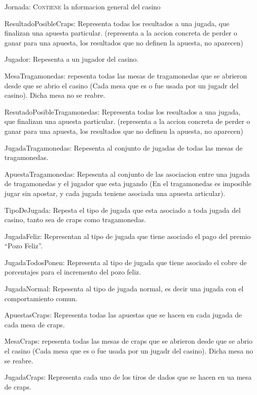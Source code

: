 Jornada: \textsc{Contiene} la nformacion general del casino

ResultadoPosibleCraps: Representa todas los resultados a una jugada, que finalizan una apuesta particular. (representa a la accion concreta de perder o ganar para una apuesta, los resultados que no definen la apuesta, no aparecen)

Jugador: Repesenta a un jugador del casino.

MesaTragamonedas: repesenta todas las mesas de tragamonedas que se abrieron desde que se abrio el casino (Cada mesa que es o fue usada por un jugadr del casino). Dicha mesa no se reabre.

ResutadoPosibleTragamonedas: Representa todas los resultados a una jugada, que finalizan una apuesta particular. (representa a la accion concreta de perder o ganar para una apuesta, los resultados que no definen la apuesta, no aparecen)

JugadaTragamonedas: Repesenta al conjunto de jugadas de todas las mesas de tragamonedas.

ApuestaTragamonedas: Repesenta al conjunto de las asociacion entre una jugada de tragamonedas y el jugador que esta jugando (En el tragamonedas es imposible jugar sin apostar, y cada jugada teniene asociada una apuesta articular).

TipoDeJugada: Repesta el tipo de jugada que esta asociado a toda jugada del casino, tanto sea de craps como tragamonedas.

JugadaFeliz: Representan al tipo de jugada que tiene asociado el pago del premio ``Pozo Feliz''.

JugadaTodosPonen: Representa al tipo de jugada que tiene asociado el cobre de porcentajes para el incremento del pozo feliz.

JugadaNormal: Repesenta al tipo de jugada normal, es decir una jugada con el comportamiento comun.

ApuestasCraps: Representa todas las apuestas que se hacen en cada jugada de cada mesa de craps.

MesaCraps: repesenta todas las mesas de craps que se abrieron desde que se abrio el casino (Cada mesa que es o fue usada por un jugadr del casino). Dicha mesa no se reabre.

JugadaCraps: Representa cada uno de los tiros de dados que se hacen en ua mesa de craps.